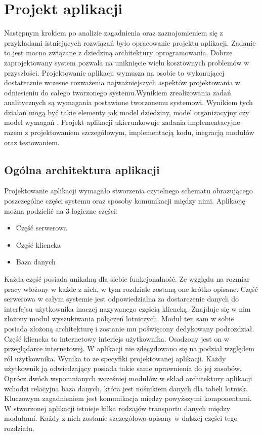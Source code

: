\documentclass[12pt, twoside]{report}
\begin{document}
\chapter{Projekt aplikacji}
Następnym krokiem po analizie zagadnienia oraz zaznajomieniem się z przykładami istniejących rozwiązań było opracowanie projektu aplikacji. Zadanie to jest mocno związane z dziedziną architektury oprogramowania. Dobrze zaprojektowany system pozwala na uniknięcie wielu kosztownych problemów w przyszłości. Projektowanie aplikacji wymusza na osobie to wykonującej dostatecznie wczesne rozważenia najważniejszych aspektów projektowania w odniesieniu do całego tworzonego systemu\cite{architektura}.Wynikiem zrealizowania zadań analitycznych są wymagania postawione tworzonemu systemowi. Wynikiem tych działań mogą być takie elementy jak model dziedziny, model organizacyjny czy model wymagań . Projekt aplikacji ukierunkowuje zadania implementacyjne razem z projektowaniem szczegółowym, implementacją kodu, inegracją modułów oraz testowaniem.

\section{Ogólna architektura aplikacji}
Projektowanie aplikacji wymagało stworzenia czytelnego schematu obrazującego poszczególne części systemu oraz sposoby komunikacji między nimi.
Aplikację można podzielić na 3 logiczne części: 
\begin{itemize}[noitemsep,topsep=0pt]
\item Część serwerowa
\item Część kliencka
\item Baza danych 
\end{itemize}
Każda część posiada unikalną dla siebie funkcjonalność. 
Ze względu na rozmiar pracy włożony w każde z nich, w tym rozdziale zostaną one krótko opisane.
Część serwerowa w całym systemie jest odpowiedzialna za dostarczenie danych do interfejsu użytkownika inaczej nazywanego częścią kliencką. Znajduje się w nim złożony moduł wyszukiwania połączeń lotniczych. Moduł ten sam w sobie posiada złożoną architekturę i  zostanie mu poświęcony dedykowany podrozdział.
Część kliencka to internetowy interfejs użytkownika. Osadzony jest on w przeglądarce internetowej. W aplikacji nie zdecydowano się na podział względem ról użytkownika. Wynika to ze specyfiki projektowanej aplikacji. Każdy użytkownik ją odwiedzający posiada takie same uprawnienia do jej zasobów.
Oprócz dwóch wspomnianych wcześniej modułów w skład architektury aplikacji wchodzi relacyjna baza danych, która jest nośnikiem danych dla tabeli lotnisk.
Kluczowym zagadnieniem jest komunikacja między powyższymi komponentami. W stworzonej aplikacji istnieje kilka rodzajów transportu danych między modułami. Każdy z nich zostanie szczegółowo opisany w dalszej części tego rozdziału.
\end{document}
